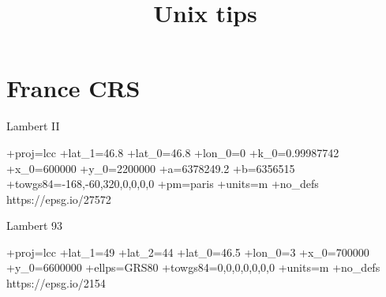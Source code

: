 


\title{Unix tips}



\date{}


\maketitle

\justify

\renewcommand{\abstractname}{}

\begin{abstract}

\end{abstract}




\section*{France CRS}

Lambert II

+proj=lcc +lat_1=46.8 +lat_0=46.8 +lon_0=0 +k_0=0.99987742 +x_0=600000 +y_0=2200000 +a=6378249.2 +b=6356515 +towgs84=-168,-60,320,0,0,0,0 +pm=paris +units=m +no_defs 
https://epsg.io/27572

Lambert 93

+proj=lcc +lat_1=49 +lat_2=44 +lat_0=46.5 +lon_0=3 +x_0=700000 +y_0=6600000 +ellps=GRS80 +towgs84=0,0,0,0,0,0,0 +units=m +no_defs 
https://epsg.io/2154















